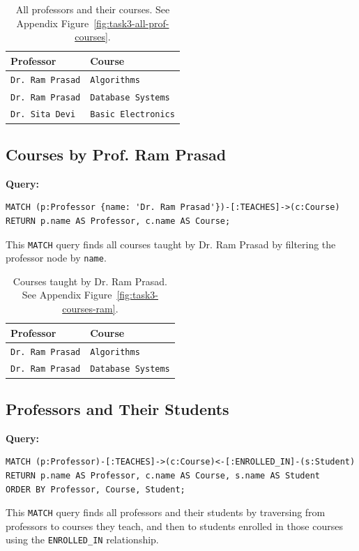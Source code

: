 \begin{table}[H]
  \centering
  \caption{All professors and their courses. See Appendix Figure~\ref{fig:task3-all-prof-courses}.}
  \begin{tabular}{|l|l|}
    \hline
    \textbf{Professor} & \textbf{Course} \\
    \hline
    \texttt{Dr. Ram Prasad} & \texttt{Algorithms} \\
    \texttt{Dr. Ram Prasad} & \texttt{Database Systems} \\
    \texttt{Dr. Sita Devi} & \texttt{Basic Electronics} \\
    \hline
  \end{tabular}
\end{table}

\subsection{Courses by Prof. Ram Prasad}
\textbf{Query:}
\begin{verbatim}
MATCH (p:Professor {name: 'Dr. Ram Prasad'})-[:TEACHES]->(c:Course)
RETURN p.name AS Professor, c.name AS Course;
\end{verbatim}
This \texttt{MATCH} query finds all courses taught by Dr. Ram Prasad by filtering the professor node by \texttt{name}.

\begin{table}[H]
  \centering
  \caption{Courses taught by Dr. Ram Prasad. See Appendix Figure~\ref{fig:task3-courses-ram}.}
  \begin{tabular}{|l|l|}
    \hline
    \textbf{Professor} & \textbf{Course} \\
    \hline
    \texttt{Dr. Ram Prasad} & \texttt{Algorithms} \\
    \texttt{Dr. Ram Prasad} & \texttt{Database Systems} \\
    \hline
  \end{tabular}
\end{table}

\subsection{Professors and Their Students}
\textbf{Query:}
\begin{verbatim}
MATCH (p:Professor)-[:TEACHES]->(c:Course)<-[:ENROLLED_IN]-(s:Student)
RETURN p.name AS Professor, c.name AS Course, s.name AS Student
ORDER BY Professor, Course, Student;
\end{verbatim}
This \texttt{MATCH} query finds all professors and their students by traversing from professors to courses they teach, and then to students enrolled in those courses using the \texttt{ENROLLED\_IN} relationship.

